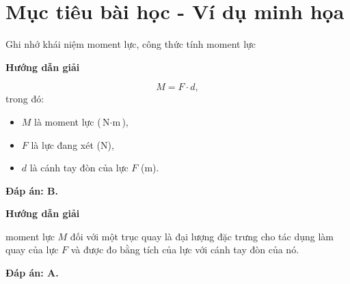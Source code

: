 \section{Mục tiêu bài học - Ví dụ minh họa}
\begin{dang}{Ghi nhớ khái niệm moment lực, công thức tính moment lực}
	{	\begin{center}
			\textbf{Hướng dẫn giải}
		\end{center}
		
		\begin{equation*}
			M = F\cdot d, \label{eq1}
		\end{equation*}
		trong đó: 
		\begin{itemize}
			\item $M$ là moment lực ($\si{\newton\cdot\meter}$), 
			\item $F$ là lực đang xét ($\si{\newton}$),
			\item $d$ là cánh tay đòn của lực $F$ ($\si{\meter}$).
		\end{itemize}
		
		\textbf{Đáp án: B.}
		
	}
	{	\begin{center}
			\textbf{Hướng dẫn giải}
		\end{center}
		
		moment lực $M$ đối với một trục quay là đại lượng đặc trưng cho tác dụng làm quay của lực $F$ và được đo bằng tích của lực với cánh tay đòn của nó.
		
		\textbf{Đáp án: A.}
		
	}
\end{dang}

